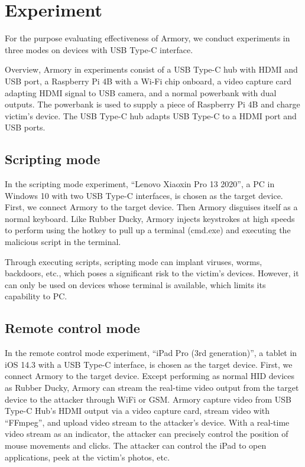 \section{Experiment}
\label{sec:experiment}

For the purpose evaluating effectiveness of Armory, we conduct experiments in three modes on devices with USB Type-C interface. 

Overview, Armory in experiments consist of a USB Type-C hub with HDMI and USB port,
a Raspberry Pi 4B with a Wi-Fi chip onboard,
a video capture card adapting HDMI signal to USB camera,
and a normal powerbank with dual outputs.
The powerbank is used to supply a piece of Raspberry Pi 4B and charge victim's device.
The USB Type-C hub adapts USB Type-C to a HDMI port and USB ports.


\subsection{Scripting mode}

In the scripting mode experiment, ``Lenovo Xiaoxin Pro 13 2020'', a PC in Windows 10 with two USB Type-C interfaces, is chosen as the target device. First, we connect Armory to the target device. Then Armory disguises itself as a normal keyboard. Like Rubber Ducky, Armory injects keystrokes at high speeds to perform using the hotkey to pull up a terminal (cmd.exe) and executing the malicious script in the terminal. 

Through executing scripts, scripting mode can implant viruses, worms, backdoors, etc., which poses a significant risk to the victim's devices. 
However, it can only be used on devices whose terminal is available, which limits its capability to PC. 

\subsection{Remote control mode}

In the remote control mode experiment, ``iPad Pro (3rd generation)'', a tablet in iOS 14.3 with a USB Type-C interface, is chosen as the target device. First, we connect Armory to the target device. 
Except performing as normal HID devices as Rubber Ducky, Armory can stream the real-time video output from the target device to the attacker through WiFi or GSM. 
Armory capture video from USB Type-C Hub's HDMI output via a video capture card, stream video with ``FFmpeg'', and upload video stream to the attacker's device.    
With a real-time video stream as an indicator, the attacker can precisely control the position of mouse movements and clicks. The attacker can control the iPad to open applications, peek at the victim's photos, etc.

